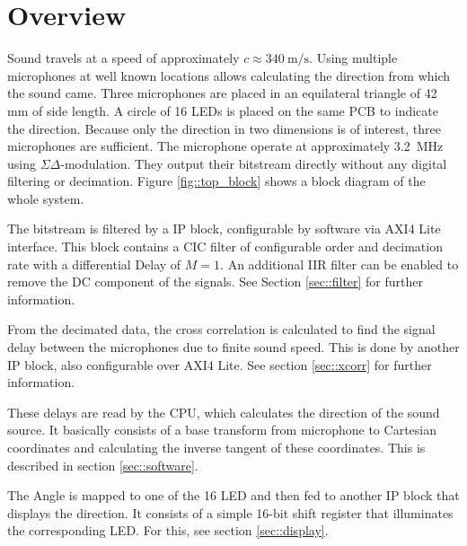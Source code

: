 \section{Overview}
Sound travels at a speed of approximately $c\approx \SI{340}{\meter\per\s}$.
Using multiple microphones at well known locations allows calculating the direction from which the sound came.
Three microphones are placed in an equilateral triangle of 42 mm of side length.
A circle of 16 LEDs is placed on the same PCB to indicate the direction.
Because only the direction in two dimensions is of interest, three microphones are sufficient.
The microphone operate at approximately \SI{3.2}{\mega\hertz} using $\Sigma\Delta$-modulation.
They output their bitstream directly without any digital filtering or decimation.
Figure \ref{fig::top_block} shows a block diagram of the whole system.

The bitstream is filtered by a IP block, configurable by software via AXI4 Lite interface.
This block contains a CIC filter of configurable order and decimation rate with a differential Delay of $M=1$.
An additional IIR filter can be enabled to remove the DC component of the signals.
See Section \ref{sec::filter} for further information.

From the decimated data, the cross correlation is calculated to find the signal delay between the microphones due to finite sound speed.
This is done by another IP block, also configurable over AXI4 Lite.
See section \ref{sec::xcorr} for further information.

These delays are read by the CPU, which calculates the direction of the sound source. 
It basically consists of a base transform from microphone to Cartesian coordinates and calculating the inverse tangent of these coordinates.
This is described in section \ref{sec::software}.

The Angle is mapped to one of the 16 LED and then fed to another IP block that displays the direction.
It consists of a simple 16-bit shift register that illuminates the corresponding LED.
For this, see section \ref{sec::display}.

